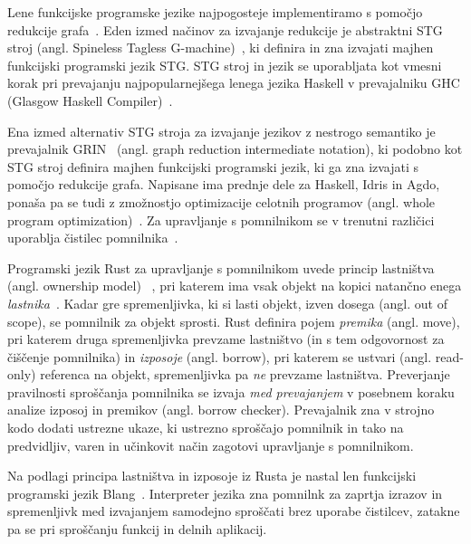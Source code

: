 \documentclass[a4paper, 12pt]{article}
\begin{document}
Lene funkcijske programske jezike najpogosteje implementiramo s pomočjo redukcije gra\-fa~\cite{peyton1987implementation}. Eden izmed načinov za izvajanje redukcije je abstraktni STG stroj (angl. Spineless Tagless G-machine)~\cite{jones1992implementing}, ki definira in zna izvajati majhen funkcijski programski jezik STG. STG stroj in jezik se uporabljata kot vmesni korak pri prevajanju najpopularnejšega lenega jezika Haskell v prevajalniku GHC (Glasgow Haskell Compiler)~\cite{GHC}.

Ena izmed alternativ STG stroja za izvajanje jezikov z nestrogo semantiko je  prevajalnik GRIN~\cite{boquist1997grin} (angl. graph reduction intermediate notation), ki podobno kot STG stroj definira majhen funkcijski programski jezik, ki ga zna izvajati s pomočjo redukcije grafa. Napisane ima prednje dele za Haskell, Idris in Agdo, ponaša pa se tudi z zmožnostjo optimizacije celotnih programov (angl. whole program optimization)~\cite{podlovics2022modern}. Za upravljanje s pomnilnikom se v trenutni različici uporablja čistilec pomnilnika~\cite{boquist1999code}.

Programski jezik Rust za upravljanje s pomnilnikom uvede princip lastništva (angl. ownership model) ~\cite{klabnik2023rust}, pri katerem ima vsak objekt na kopici natančno enega \textit{lastnika}~\cite{Jung, Oxide, StackedBorrows}. Kadar gre spremenljivka, ki si lasti objekt, izven dosega (angl. out of scope), se pomnilnik za objekt sprosti. Rust definira pojem \textit{premika} (angl. move), pri katerem druga spremenljivka prevzame lastništvo (in s tem odgovornost za čiščenje pomnilnika) in \textit{izposoje} (angl. borrow), pri katerem se ustvari (angl. read-only) referenca na objekt, spremenljivka pa \textit{ne} prevzame lastništva. Preverjanje pravilnosti sproščanja pomnilnika se izvaja \textit{med prevajanjem} v posebnem koraku analize izposoj in premikov (angl. borrow checker). Prevajalnik zna v strojno kodo dodati ustrezne ukaze, ki ustrezno sproščajo pomnilnik in tako na predvidljiv, varen in učinkovit način zagotovi upravljanje s pomnilnikom.

Na podlagi principa lastništva in izposoje iz Rusta je nastal len funkcijski programski jezik Blang~\cite{Kocjan_Turk_2022}. Interpreter jezika zna pomnilnk za zaprtja izrazov in spremenljivk med izvajanjem samodejno sproščati brez uporabe čistilcev, zatakne pa se pri sproščanju funkcij in delnih aplikacij.


\end{document}
